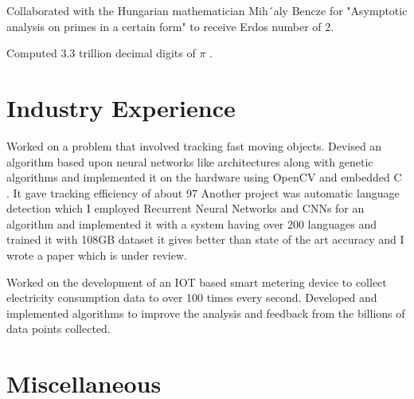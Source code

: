 \documentclass[]{deedy-resume-openfont}
\begin{document}
\begin{tightemize}
\item Collaborated with the Hungarian mathematician Mih´aly Bencze for "Asymptotic analysis on primes in a certain form" to receive Erdos number of 2.

\end{tightemize}
\sectionsep

\begin{tightemize}
\item Computed $3.3$ trillion decimal digits of $\pi$ .
\end{tightemize}
\sectionsep



\section{Industry Experience}

Worked on a problem that involved tracking fast moving objects. Devised an algorithm based upon neural networks like architectures along with genetic algorithms and implemented it on the hardware using OpenCV and embedded C . It gave tracking efficiency of about 97%
Another project was automatic language detection which I employed Recurrent Neural Networks and CNNs for an algorithm and implemented it with a system having over 200 languages and trained it with 108GB dataset it gives better than state of the art accuracy and I wrote a paper which is under review.

\sectionsep

Worked on the development of an IOT based smart metering device to collect electricity consumption data to over 100 times every second. Developed and implemented algorithms to improve the analysis and feedback from the billions of data points collected.

\sectionsep



\section{Miscellaneous}
\hline
\vspace{\topsep}
\end{document}
